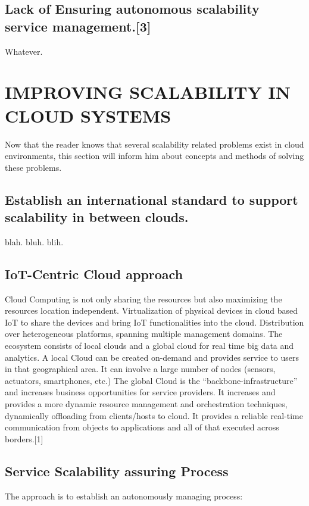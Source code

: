 \documentclass[sigconf]{acmart}
\begin{document}
\subsection{Lack of Ensuring autonomous scalability service management.[3]}
Whatever.

\section{IMPROVING SCALABILITY IN CLOUD SYSTEMS}
Now that the reader knows that several scalability related
problems exist in cloud environments, this section will inform
him about concepts and methods of solving these problems.

\subsection{Establish an international standard to support scalability in between clouds.}
blah. bluh. blih.

\subsection{IoT-Centric Cloud approach}
Cloud Computing is not only sharing the resources but also
maximizing the resources location independent. Virtualization
of physical devices in cloud based IoT to share the devices and
bring IoT functionalities into the cloud. Distribution over
heterogeneous platforms, spanning multiple management
domains. The ecosystem consists of local clouds and a global
cloud for real time big data and analytics.
A local Cloud can be created on-demand and provides service
to users in that geographical area. It can involve a large
number of nodes (sensors, actuators, smartphones, etc.)
The global Cloud is the “backbone-infrastructure” and
increases business opportunities for service providers. It
increases and provides a more dynamic resource management
and orchestration techniques, dynamically offloading from
clients/hosts to cloud. It provides a reliable real-time
communication from objects to applications and all of that
executed across borders.[1]


\subsection{Service Scalability assuring Process}
The approach is to establish an autonomously managing
process:
\end{document}
